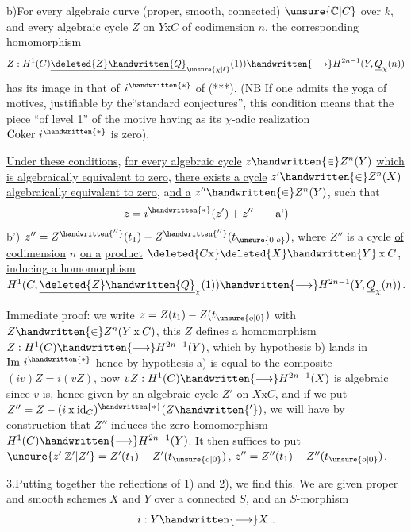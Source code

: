 b)\quad For every algebraic curve (proper, smooth, connected) $\unsure{\mathbb{C}|C}$ over $k$, and every algebraic cycle $Z$ on $Y\mathbin{\mathrm{x}}C$ of codimension $n$, the corresponding homomorphism
\[
Z:H^1(C)\underline{\deleted{Z}\handwritten{Q}}_{\unsure{\chi|\ell}}(1))\handwritten{\longrightarrow}H^{2n-1}(Y,\underline{Q}_{\chi}(n))
\]
has its image in that of $i^{\handwritten{*}}$ of (***). (NB If one admits the yoga of motives, justifiable by the``standard conjectures'', this condition means that the  piece  ``of level 1'' of the motive  having as its $\chi$-adic realization $\mathrm{Coker}\ i^{\handwritten{*}}$ is zero).

\uline{Under these conditions}, \uline{for every algebraic cycle} $z\handwritten{\in}Z^n(Y)$ \uline{which is algebraically equivalent to zero}, \uline{there exists a cycle} $z'\handwritten{\in}Z^n(X)$ \uline{algebraically equivalent to zero}, a\uline{nd a} $z''\handwritten{\in}Z^n(Y)$, such that
\[
z=i^{\handwritten{*}}(z')+z''\tag*{a')}
\]
b')\quad {} $z''=Z^{\handwritten{''}}(t_1)-Z^{\handwritten{''}}(t_{\unsure{0|o}})$, where $Z''$ is a cycle \uline{of codimension} $n$ \uline{on a} \uline{product} $\deleted{C\mathrm{x}}\deleted{X}\handwritten{Y}\mathbin{\mathrm{x}}C$, \uline{inducing a homomorphism}   $H^1(C,\underline{\deleted{Z}\handwritten{Q}}_{\chi}(1))\handwritten{\longrightarrow}H^{2n-1}(Y,\underline{Q}_{\chi}(n))$.

Immediate proof: we write $z=Z(t_1)-Z(t_{\unsure{o|0}})$ with $Z\handwritten{\in}Z^n(Y\mathbin{\mathrm{x}}C)$, this $Z$ defines a homomorphism $Z:H^1(C)\handwritten{\longrightarrow}H^{2n-1}(Y)$,  which by hypothesis b) lands in $\mathrm{Im}\ i^{\handwritten{*}}$ hence by hypothesis a) is equal to the composite $(iv)Z=i(vZ)$, now $vZ:H^1(C)\handwritten{\longrightarrow}H^{2n-1}(X)$ is algebraic since $v$ is, hence given by an algebraic cycle $Z'$ on $X\mathbin{\mathrm{x}}C$, and if we put $Z''=Z-(i\mathbin{\mathrm{x}}\mathrm{id}_C)^{\handwritten{*}}(Z\handwritten{'} )$, we will have by construction that $Z''$ induces the zero homomorphism $H^1(C)\handwritten{\longrightarrow}H^{2n-1}(Y)$.  It then suffices to put $\unsure{z'|\mathbb{Z}'|Z'}=Z'(t_1)-Z'(t_{\unsure{o|0}})$, $z''=Z''(t_1)-Z''(t_{\unsure{o|0}})$.

3.\quad Putting together the reflections of 1) and 2), we find this. We are given proper and smooth schemes $X$ and $Y$ over a  connected $S$, and an $S$-morphism
\[
i:Y\handwritten{\longrightarrow}X\ .
\]

